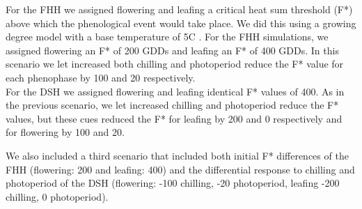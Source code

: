 \documentclass{article}\usepackage[]{graphicx}\usepackage[]{color}
\begin{document}
\noindent For the FHH we assigned flowering and leafing a critical heat sum threshold (F*) above which the phenological event would take place. We did this using a growing degree model with a base temperature of 5\degree C \citep{}. For the FHH simulations, we assigned flowering an F* of 200 GDDs and leafing an F* of 400 GDDs. In this scenario we let increased both chilling and photoperiod reduce the F* value for each phenophase by 100 and 20 respectively.\\

\noindent For the DSH we assigned flowering and leafing identical F* values of 400. As in the previous scenario, we let increased chilling and photoperiod reduce the F* values, but these cues reduced the F* for leafing by 200 and 0 respectively and for flowering by 100 and 20.

\noindent We also included a third scenario that included both initial F* differences of the FHH (flowering: 200 and leafing: 400) and the differential response to chilling and photoperiod of the DSH (flowering: -100 chilling, -20 photoperiod, leafing -200 chilling, 0 photoperiod).

 
\end{document}
